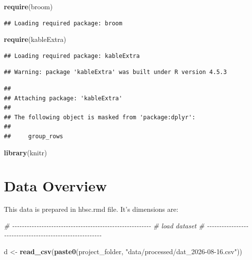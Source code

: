 \documentclass[
]{article}
\newenvironment{Shaded}{\begin{snugshade}}{\end{snugshade}}
\newcommand{\CommentTok}[1]{\textcolor[rgb]{0.56,0.35,0.01}{\textit{#1}}}
\newcommand{\FunctionTok}[1]{\textcolor[rgb]{0.13,0.29,0.53}{\textbf{#1}}}
\newcommand{\NormalTok}[1]{#1}
\newcommand{\OtherTok}[1]{\textcolor[rgb]{0.56,0.35,0.01}{#1}}
\newcommand{\StringTok}[1]{\textcolor[rgb]{0.31,0.60,0.02}{#1}}
\begin{document}
\begin{Shaded}
\begin{Highlighting}[]
\FunctionTok{require}\NormalTok{(broom)}
\end{Highlighting}
\end{Shaded}

\begin{verbatim}
## Loading required package: broom
\end{verbatim}

\begin{Shaded}
\begin{Highlighting}[]
\FunctionTok{require}\NormalTok{(kableExtra)}
\end{Highlighting}
\end{Shaded}

\begin{verbatim}
## Loading required package: kableExtra
\end{verbatim}

\begin{verbatim}
## Warning: package 'kableExtra' was built under R version 4.5.3
\end{verbatim}

\begin{verbatim}
## 
## Attaching package: 'kableExtra'
## 
## The following object is masked from 'package:dplyr':
## 
##     group_rows
\end{verbatim}

\begin{Shaded}
\begin{Highlighting}[]
\FunctionTok{library}\NormalTok{(knitr)}
\end{Highlighting}
\end{Shaded}

\section{Data Overview}\label{data-overview}

This data is prepared in hbsc.rmd file. It's dimensions are:

\begin{Shaded}
\begin{Highlighting}[]
\CommentTok{\# {-}{-}{-}{-}{-}{-}{-}{-}{-}{-}{-}{-}{-}{-}{-}{-}{-}{-}{-}{-}{-}{-}{-}{-}{-}{-}{-}{-}{-}{-}{-}{-}{-}{-}{-}{-}{-}{-}{-}{-}{-}{-}{-}{-}{-}{-}{-}{-}{-}{-}{-}{-}{-}{-}{-}{-}{-}}
\CommentTok{\# load dataset}
\CommentTok{\# {-}{-}{-}{-}{-}{-}{-}{-}{-}{-}{-}{-}{-}{-}{-}{-}{-}{-}{-}{-}{-}{-}{-}{-}{-}{-}{-}{-}{-}{-}{-}{-}{-}{-}{-}{-}{-}{-}{-}{-}{-}{-}{-}{-}{-}{-}{-}{-}{-}{-}{-}{-}{-}{-}{-}{-}{-}}

\NormalTok{d }\OtherTok{\textless{}{-}} \FunctionTok{read\_csv}\NormalTok{(}\FunctionTok{paste0}\NormalTok{(project\_folder, }\StringTok{"data/processed/dat\_2026{-}08{-}16.csv"}\NormalTok{))}
\end{Highlighting}
\end{Shaded}
\end{document}
